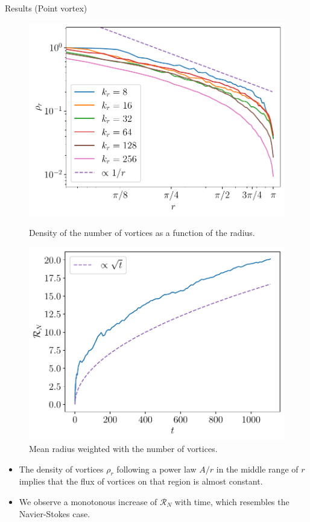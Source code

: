 \documentclass{beamer} %
\begin{document}
\begin{frame}{Results (Point vortex)}
	\begin{figure}[ht]
		\centering
		\begin{minipage}[t]{0.44\textwidth}
			\centering
			\includegraphics[width=\textwidth]{../images/NumVortices.pdf}
			\caption{Density of the number of vortices as a function of the radius.}
		\end{minipage}\hspace{0.04\textwidth}
		\begin{minipage}[t]{0.44\textwidth}
			\centering
			\includegraphics[width=\textwidth]{../images/NumVorticesMeanRadius.pdf}
			\caption{Mean radius weighted with the number of vortices.}		\end{minipage}
	\end{figure}
	\vspace{-0.2cm}
	\begin{itemize}
		\item The density of vortices $\rho_r$ following a power law $A/r$ in the middle range of $r$ implies that the flux of vortices on that region is almost constant.
		\item We observe a monotonous increase of $\mathcal{R}_N$ with time, which resembles the Navier-Stokes case.
	\end{itemize}
\end{frame}
\end{document}
